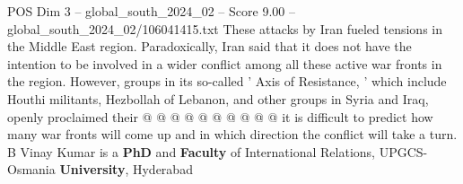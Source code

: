 \begin{textsample}{POS Dim 3 – global\_south\_2024\_02 – Score 9.00 – global\_south\_2024\_02/106041415.txt}
These attacks by Iran fueled tensions in the Middle East region.
Paradoxically, Iran said that it does not have the intention to be involved in a wider conflict among all these active war fronts in the region.
However, groups in its so-called ' Axis of Resistance, ' which include Houthi militants, Hezbollah of Lebanon, and other groups in Syria and Iraq, openly proclaimed their @ @ @ @ @ @ @ @ @ @ it is difficult to predict how many war fronts will come up and in which direction the conflict will take a turn.
B Vinay Kumar is a \textbf{PhD} and \textbf{Faculty} of International Relations, UPGCS-Osmania \textbf{University}, Hyderabad

\end{textsample}

